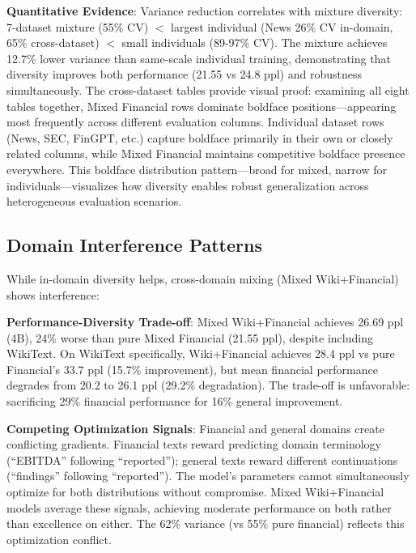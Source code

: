 \textbf{Quantitative Evidence}: Variance reduction correlates with mixture diversity: 7-dataset mixture (55\% CV) $<$ largest individual (News 26\% CV in-domain, 65\% cross-dataset) $<$ small individuals (89-97\% CV). The mixture achieves 12.7\% lower variance than same-scale individual training, demonstrating that diversity improves both performance (21.55 vs 24.8 ppl) and robustness simultaneously. The cross-dataset tables provide visual proof: examining all eight tables together, Mixed Financial rows dominate boldface positions—appearing most frequently across different evaluation columns. Individual dataset rows (News, SEC, FinGPT, etc.) capture boldface primarily in their own or closely related columns, while Mixed Financial maintains competitive boldface presence everywhere. This boldface distribution pattern—broad for mixed, narrow for individuals—visualizes how diversity enables robust generalization across heterogeneous evaluation scenarios.

\subsection{Domain Interference Patterns}

While in-domain diversity helps, cross-domain mixing (Mixed Wiki+Financial) shows interference:

\textbf{Performance-Diversity Trade-off}: Mixed Wiki+Financial achieves 26.69 ppl (4B), 24\% worse than pure Mixed Financial (21.55 ppl), despite including WikiText. On WikiText specifically, Wiki+Financial achieves 28.4 ppl vs pure Financial's 33.7 ppl (15.7\% improvement), but mean financial performance degrades from 20.2 to 26.1 ppl (29.2\% degradation). The trade-off is unfavorable: sacrificing 29\% financial performance for 16\% general improvement.

\textbf{Competing Optimization Signals}: Financial and general domains create conflicting gradients. Financial texts reward predicting domain terminology (``EBITDA'' following ``reported''); general texts reward different continuations (``findings'' following ``reported''). The model's parameters cannot simultaneously optimize for both distributions without compromise. Mixed Wiki+Financial models average these signals, achieving moderate performance on both rather than excellence on either. The 62\% variance (vs 55\% pure financial) reflects this optimization conflict.

